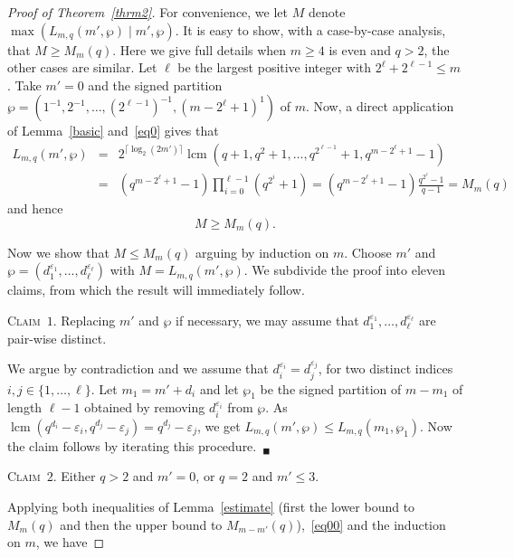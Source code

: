 \documentclass{amsart}
\begin{document}
\begin{proof}[Proof of Theorem~\ref{thrm2}]
For convenience, we let $M$ denote $\max(L_{m,q}(m',\wp)\mid m',\wp)$. It is easy to show, with a case-by-case analysis, that $M\geq M_m(q)$. Here we give full details when $m\geq 4$ is even and $q>2$, the other cases are similar. Let $\ell$ be the largest positive integer with $2^\ell+2^{\ell-1}\leq m$. Take ${m'}=0$ and the signed partition $\wp=(1^{-1},2^{-1},\ldots,(2^{\ell-1})^{-1},(m-2^{\ell}+1)^{1})$ of $m$. Now, a direct application of  Lemma~\ref{basic} and~\eqref{eq0} gives that 
\begin{eqnarray*}
L_{m,q}({m'},\wp)&=&2^{\lceil \log_2(2{m'})\rceil}{\mathop{\mathrm{lcm}}}(q+1,q^2+1,\ldots,q^{2^{\ell-1}}+1,q^{m-2^{\ell}+1}-1)\\
&=&(q^{m-2^\ell+1}-1)\prod_{i=0}^{\ell-1}(q^{2^i}+1)=(q^{m-2^{\ell}+1}-1)\frac{q^{2^\ell}-1}{q-1}=M_m(q)
\end{eqnarray*}
and hence 
\begin{equation}\label{eq00}
M\geq M_m(q).
\end{equation}

Now we show  that $M\leq M_m(q)$ arguing by induction on $m$. Choose ${m'}$ and $\wp=(d_1^{\varepsilon_1},\ldots,d_\ell^{\varepsilon_\ell})$ with $M=L_{m,q}({m'},\wp)$. We subdivide the proof into eleven claims, from which the result will immediately follow.

\smallskip

\noindent\textsc{Claim~$1$. }Replacing ${m'}$ and $\wp$ if necessary, we may assume that $d_1^{\varepsilon_1},\ldots,d_\ell^{\varepsilon_\ell}$ are pair-wise distinct.

\smallskip

\noindent  We argue by contradiction and we assume that $d_i^{\varepsilon_i}=d_j^{\varepsilon_j}$, for two distinct indices $i,j\in \{1,\ldots,\ell\}$. Let $m_1={m'}+d_i$ and let $\wp_1$ be the signed partition of $m-m_1$ of length $\ell-1$ obtained by removing $d_i^{\varepsilon_i}$ from $\wp$. As ${\mathop{\mathrm{lcm}}}(q^{d_i}-\varepsilon_i,q^{d_j}-\varepsilon_j)=q^{d_j}-\varepsilon_j$, we get $L_{m,q}({m'},\wp)\leq L_{m,q}(m_1,\wp_1)$. Now the claim follows by iterating this procedure.~$_\blacksquare$

\smallskip

\noindent\textsc{Claim~$2$. }Either $q>2$ and ${m'}=0$, or $q=2$ and ${m'}\leq 3$.

\smallskip

\noindent Applying both inequalities of Lemma~\ref{estimate} (first the lower bound to $M_m(q)$ and then the upper bound to $M_{m-m'}(q)$),~\eqref{eq00} and the induction on $m$, we have


\end{proof}
\end{document}
